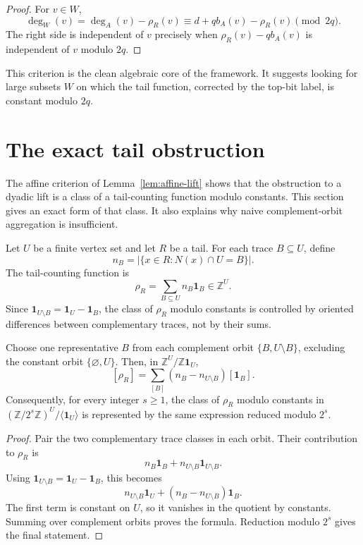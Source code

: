 \documentclass[thmsec,dntnbr,nolinenbrs]{dmgt}
\numberwithin{equation}{section}
\newcommand{\Z}{\mathbb{Z}}
\newcommand{\one}{\mathbf{1}}
\begin{document}
\begin{proof}
For \(v\in W\),
\[
        \deg_W(v)
        =\deg_A(v)-\rho_R(v)
        \equiv d+qb_A(v)-\rho_R(v)\pmod{2q}.
\]
The right side is independent of \(v\) precisely when \(\rho_R(v)-qb_A(v)\) is independent of \(v\) modulo \(2q\).
\end{proof}

This criterion is the clean algebraic core of the framework.  It suggests looking for large subsets \(W\) on which the tail function, corrected by the top-bit label, is constant modulo \(2q\).

\section{The exact tail obstruction}

The affine criterion of Lemma~\ref{lem:affine-lift} shows that the obstruction to a dyadic lift is a class of a tail-counting function modulo constants.  This section gives an exact form of that class.  It also explains why naive complement-orbit aggregation is insufficient.

Let \(U\) be a finite vertex set and let \(R\) be a tail.  For each trace \(B\subseteq U\), define
\[
        n_B=|\{x\in R:N(x)\cap U=B\}|.
\]
The tail-counting function is
\[
        \rho_R=\sum_{B\subseteq U} n_B\one_B\in \Z^U.
\]
Since \(\one_{U\setminus B}=\one_U-\one_B\), the class of \(\rho_R\) modulo constants is controlled by oriented differences between complementary traces, not by their sums.

\begin{proposition}\label{prop:complement-difference}
Choose one representative \(B\) from each complement orbit \(\{B,U\setminus B\}\), excluding the constant orbit \(\{\varnothing,U\}\).  Then, in \(\Z^U/\Z\one_U\),
\[
        [\rho_R]
        =\sum_{[B]}(n_B-n_{U\setminus B})[\one_B].
\]
Consequently, for every integer \(s\ge 1\), the class of \(\rho_R\) modulo constants in \((\Z/2^s\Z)^U/\langle \one_U\rangle\) is represented by the same expression reduced modulo \(2^s\).
\end{proposition}

\begin{proof}
Pair the two complementary trace classes in each orbit.  Their contribution to \(\rho_R\) is
\[
        n_B\one_B+n_{U\setminus B}\one_{U\setminus B}.
\]
Using \(\one_{U\setminus B}=\one_U-\one_B\), this becomes
\[
        n_{U\setminus B}\one_U+(n_B-n_{U\setminus B})\one_B.
\]
The first term is constant on \(U\), so it vanishes in the quotient by constants.  Summing over complement orbits proves the formula.  Reduction modulo \(2^s\) gives the final statement.
\end{proof}
\end{document}
